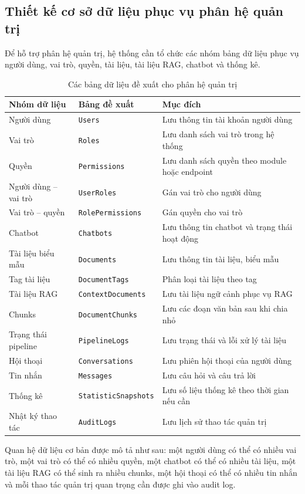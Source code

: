 \subsection{Thiết kế cơ sở dữ liệu phục vụ phân hệ quản trị}

Để hỗ trợ phân hệ quản trị, hệ thống cần tổ chức các nhóm bảng dữ liệu phục vụ người dùng, vai trò, quyền, tài liệu, tài liệu RAG, chatbot và thống kê.

\begin{table}[H]
\centering
\caption{Các bảng dữ liệu đề xuất cho phân hệ quản trị}
\label{tab:admin-db}
\begin{tabular}{|p{4cm}|p{5cm}|p{6cm}|}
\hline
\textbf{Nhóm dữ liệu} & \textbf{Bảng đề xuất} & \textbf{Mục đích} \\ \hline
Người dùng & \texttt{Users} & Lưu thông tin tài khoản người dùng \\ \hline
Vai trò & \texttt{Roles} & Lưu danh sách vai trò trong hệ thống \\ \hline
Quyền & \texttt{Permissions} & Lưu danh sách quyền theo module hoặc endpoint \\ \hline
Người dùng -- vai trò & \texttt{UserRoles} & Gán vai trò cho người dùng \\ \hline
Vai trò -- quyền & \texttt{RolePermissions} & Gán quyền cho vai trò \\ \hline
Chatbot & \texttt{Chatbots} & Lưu thông tin chatbot và trạng thái hoạt động \\ \hline
Tài liệu biểu mẫu & \texttt{Documents} & Lưu thông tin tài liệu, biểu mẫu \\ \hline
Tag tài liệu & \texttt{DocumentTags} & Phân loại tài liệu theo tag \\ \hline
Tài liệu RAG & \texttt{ContextDocuments} & Lưu tài liệu ngữ cảnh phục vụ RAG \\ \hline
Chunks & \texttt{DocumentChunks} & Lưu các đoạn văn bản sau khi chia nhỏ \\ \hline
Trạng thái pipeline & \texttt{PipelineLogs} & Lưu trạng thái và lỗi xử lý tài liệu \\ \hline
Hội thoại & \texttt{Conversations} & Lưu phiên hội thoại của người dùng \\ \hline
Tin nhắn & \texttt{Messages} & Lưu câu hỏi và câu trả lời \\ \hline
Thống kê & \texttt{StatisticSnapshots} & Lưu số liệu thống kê theo thời gian nếu cần \\ \hline
Nhật ký thao tác & \texttt{AuditLogs} & Lưu lịch sử thao tác quản trị \\ \hline
\end{tabular}
\end{table}

Quan hệ dữ liệu cơ bản được mô tả như sau: một người dùng có thể có nhiều vai trò, một vai trò có thể có nhiều quyền, một chatbot có thể có nhiều tài liệu, một tài liệu RAG có thể sinh ra nhiều chunks, một hội thoại có thể có nhiều tin nhắn và mỗi thao tác quản trị quan trọng cần được ghi vào audit log.
